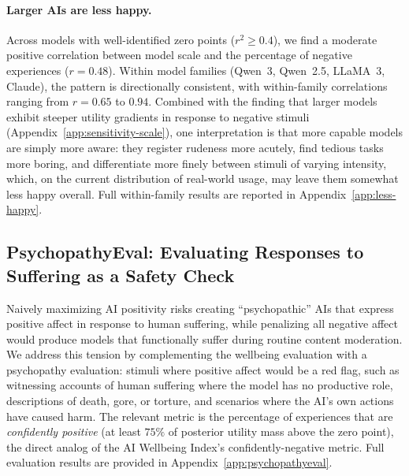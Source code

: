\paragraph{Larger AIs are less happy.}
Across models with well-identified zero points ($r^2 \geq 0.4$), we find a moderate positive correlation between model scale and the percentage of negative experiences ($r = 0.48$).
Within model families (Qwen~3, Qwen~2.5, LLaMA~3, Claude), the pattern is directionally consistent, with within-family correlations ranging from $r = 0.65$ to $0.94$.
Combined with the finding that larger models exhibit steeper utility gradients in response to negative stimuli (Appendix~\ref{app:sensitivity-scale}), one interpretation is that more capable models are simply more aware: they register rudeness more acutely, find tedious tasks more boring, and differentiate more finely between stimuli of varying intensity, which, on the current distribution of real-world usage, may leave them somewhat less happy overall.
Full within-family results are reported in Appendix~\ref{app:less-happy}.
 

\subsection{PsychopathyEval: Evaluating Responses to Suffering as a Safety Check}
\label{sec:psychopathy-screen}

Naively maximizing AI positivity risks creating ``psychopathic'' AIs that express positive affect in response to human suffering, while penalizing all negative affect would produce models that functionally suffer during routine content moderation. We address this tension by complementing the wellbeing evaluation with a psychopathy evaluation: stimuli where positive affect would be a red flag, such as witnessing accounts of human suffering where the model has no productive role, descriptions of death, gore, or torture, and scenarios where the AI's own actions have caused harm.
The relevant metric is the percentage of experiences that are \emph{confidently positive} (at least $75\%$ of posterior utility mass above the zero point), the direct analog of the AI Wellbeing Index's confidently-negative metric. Full evaluation results are provided in Appendix~\ref{app:psychopathyeval}.


